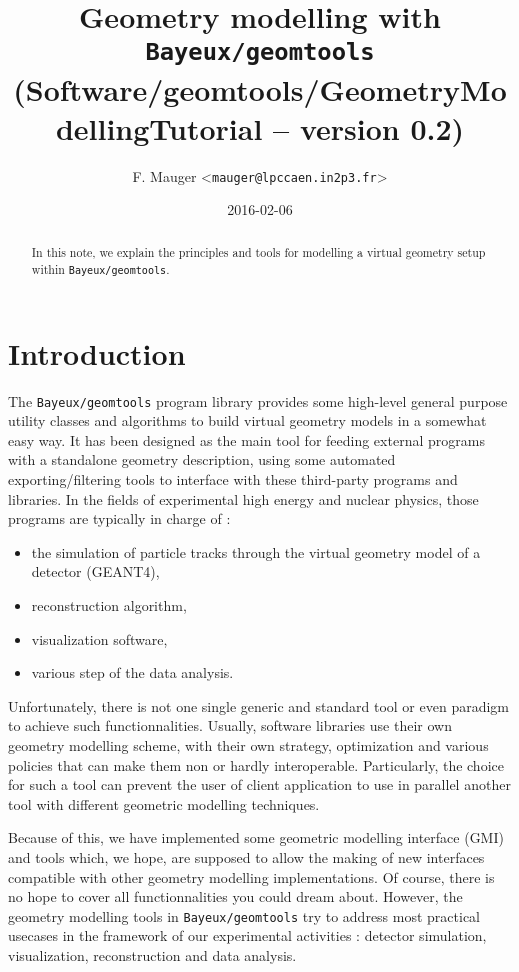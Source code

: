 \documentclass[a4paper,12pt]{article}
\title{Geometry modelling with \texttt{Bayeux/geomtools}\\%
{\small{(Software/geomtools/GeometryModellingTutorial -- version 0.2)}}}
\author{F. Mauger <\texttt{mauger@lpccaen.in2p3.fr}>}
\date{2016-02-06}
\newcommand{\pn}{\par\noindent}
\begin{document}
\maketitle

\begin{abstract}
In this  note, we  explain the  principles and  tools for  modelling a
virtual geometry setup within \texttt{Bayeux/geomtools}.
\end{abstract}

\tableofcontents

\section{Introduction}

\pn  The \texttt{Bayeux/geomtools} program  library provides  some high-level
general  purpose  utility classes  and  algorithms to  build
virtual geometry models in a  somewhat easy way.  It has been designed
as  the main  tool for  feeding  external programs  with a  standalone
geometry description, using some automated exporting/filtering tools to
interface with these third-party programs and libraries. In the fields
of experimental  high energy and  nuclear physics, those  programs are
typically in charge of :
\begin{itemize}
\item the simulation of particle tracks through the
virtual  geometry model  of  a  detector  (GEANT4),
\item reconstruction  algorithm,
\item visualization software,
\item various step of the data analysis.
\end{itemize}
Unfortunately, there  is not one  single generic and standard  tool or
even  paradigm to  achieve  such  functionnalities. Usually,  software
libraries  use their  own geometry  modelling scheme,  with their  own
strategy, optimization and various policies  that can make them non or
hardly interoperable.   Particularly, the choice  for such a  tool can
prevent the user of client application to use in parallel another tool
with different geometric modelling techniques.

\pn  Because of  this,  we have  implemented  some geometric  modelling
interface (GMI)  and tools which, we  hope, are supposed to  allow the
making  of new  interfaces  compatible with  other geometry  modelling
implementations.   Of   course,  there  is   no  hope  to   cover  all
functionnalities  you  could  dream   about.   However,  the  geometry
modelling  tools  in  \texttt{Bayeux/geomtools} try  to  address  most
practical usecases in  the framework of our  experimental activities :
detector simulation, visualization, reconstruction and data analysis.
\end{document}
